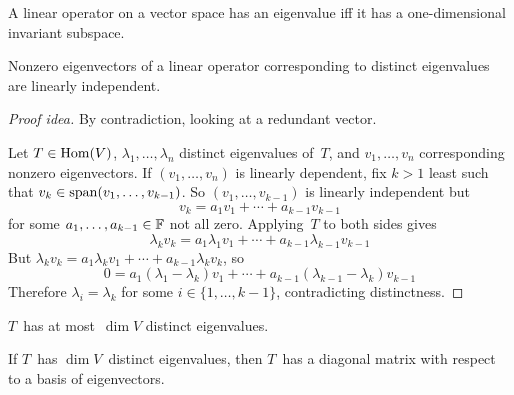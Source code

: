 \begin{thm}
A linear operator on a vector space has an eigenvalue iff it has a one-dimensional invariant subspace.
\end{thm}

\begin{thm}
Nonzero eigenvectors of a linear operator corresponding to distinct eigenvalues are linearly independent.
\end{thm}
\begin{proof}[Proof idea]
By contradiction, looking at a redundant vector.

Let \(T\in\operatorname{Hom}(V)\), \(\lambda_1,\ldots,\lambda_n\) distinct eigenvalues of~\(T\), and \(v_1,\ldots,v_n\) corresponding nonzero eigenvectors. If \((v_1,\ldots,v_n)\) is linearly dependent, fix \(k>1\) least such that \(v_k\in\operatorname{span}(v_1,\ldots,v_{k-1})\). So \((v_1,\ldots,v_{k-1})\) is linearly independent but 
\[v_k=a_1v_1+\cdots+a_{k-1}v_{k-1}\]
for some \(a_1,\ldots,a_{k-1}\in\mathbb{F}\) not all zero. Applying~\(T\) to both sides gives
\[\lambda_kv_k=a_1\lambda_1v_1+\cdots+a_{k-1}\lambda_{k-1}v_{k-1}\]
But \(\lambda_kv_k=a_1\lambda_kv_1+\cdots+a_{k-1}\lambda_kv_k\), so
\[0=a_1(\lambda_1-\lambda_k)v_1+\cdots+a_{k-1}(\lambda_{k-1}-\lambda_k)v_{k-1}\]
Therefore \(\lambda_i=\lambda_k\) for some \(i\in\{1,\ldots,k-1\}\), contradicting distinctness.
\end{proof}

\begin{cor}
\(T\)~has at most~\(\dim V\) distinct eigenvalues.
\end{cor}

\begin{cor}
If \(T\)~has \(\dim V\)~distinct eigenvalues, then \(T\)~has a diagonal matrix with respect to a basis of eigenvectors.
\end{cor}

